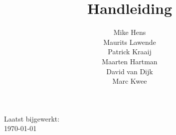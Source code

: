 \documentclass[11pt]{article}
\title{Handleiding \customerdomainuc}
\author{Mike Hens \\ Maurits Lawende \\ Patrick Kraaij \\ Maarten Hartman \\ David van Dijk \\ Marc Kwee}
\date{}
\begin{document}
\maketitle
\begin{center}

Laatst bijgewerkt: \\ \ddmmyyyydate \today
\end{center}
\pagebreak

\renewcommand*\contentsname{Inhoudsopgave}
\tableofcontents
\pagebreak








\clearpage
\end{document}

